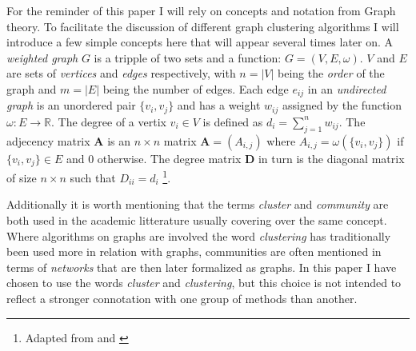 For the reminder of this paper I will rely on concepts and notation from 
Graph theory. To facilitate the discussion of different graph clustering 
algorithms I will introduce a few simple concepts here that will appear 
several times later on. A \emph{weighted graph} $G$ is a tripple of two 
sets and a function: $G = (V, E, \omega)$. $V$ and $E$ are sets of 
\emph{vertices} and \emph{edges} respectively, with $n = |V|$ being the 
\emph{order} of the graph and $m = |E|$ being the number of edges. Each 
edge $e_{ij}$ in an \emph{undirected graph} is an unordered pair $\{v_i, 
v_j\}$ and has a weight $w_{ij}$ assigned by the function $\omega : E 
\rightarrow \mathbb{R}$. The degree of a vertix $v_i \in V$ is defined 
as $d_i = \sum_{j = 1}^n w_{ij}$. The adjecency matrix $\textbf{A}$ is 
an $n \times n$ matrix $\textbf{A} = (A_{i,j})$ where $A_{i,j} = 
\omega(\{v_i,v_j\})$ if $\{v_i,v_j\} \in E$ and $0$ otherwise.  The 
degree matrix $\textbf{D}$ in turn is the diagonal matrix of size $n 
\times n$ such that $D_{ii} = d_i$
\footnote{Adapted from \cite{schaeffer2007} and \cite{von2007}}.

Additionally it is worth mentioning that the terms \emph{cluster} and 
\emph{community} are both used in the academic litterature usually 
covering over the same concept. Where algorithms on graphs are involved 
the word \emph{clustering} has traditionally been used more in relation 
with graphs, communities are often mentioned in terms of \emph{networks} 
that are then later formalized as graphs. In this paper I have chosen to 
use the words \emph{cluster} and \emph{clustering}, but this choice is 
not intended to reflect a stronger connotation with one group of methods 
than another.

